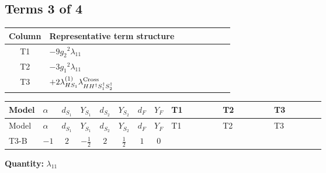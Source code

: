 \documentclass[8pt]{article}
\begin{document}
\begin{landscape}
\subsection*{Terms 3 of 4}
\begin{center}
\begin{tabular}{@{}c >{\raggedright\arraybackslash}p{0.82\linewidth}@{}}
\toprule
Column & Representative term structure \\
\midrule
T1 & \(\displaystyle -9 {g_2}^2 {\lambda_{11}}\) \\
\midrule
T2 & \(\displaystyle -3 {g_1}^2 {\lambda_{11}}\) \\
\midrule
T3 & \(\displaystyle +2 {\lambda_{HS_1}^{(1)}} {\lambda_{H H^\dagger S_1^\dagger S_2^\dagger}^{\rm Cross}}\) \\
\midrule
\bottomrule
\end{tabular}
\end{center}
\smallskip
\tiny
\begin{longtable}{@{}llcccccc >{\raggedright\arraybackslash}p{0.21\linewidth} >{\raggedright\arraybackslash}p{0.21\linewidth} >{\raggedright\arraybackslash}p{0.21\linewidth}@{}}
\toprule
Model & $\alpha$ & $d_{S_1}$ & $Y_{S_1}$ & $d_{S_2}$ & $Y_{S_2}$ & $d_F$ & $Y_F$ & T1 & T2 & T3 \\
\midrule
\endfirsthead
\toprule
Model & $\alpha$ & $d_{S_1}$ & $Y_{S_1}$ & $d_{S_2}$ & $Y_{S_2}$ & $d_F$ & $Y_F$ & T1 & T2 & T3 \\
\midrule
\endhead
T3-B & $-1$ & $2$ & $-\frac{1}{2}$ & $2$ & $\frac{1}{2}$ & $1$ & $0$ & \scriptsize\adjustbox{max width=\linewidth}{$\begin{gathered} -9 {g_2}^2 {\lambda_{11}}\end{gathered}$} & \scriptsize\adjustbox{max width=\linewidth}{$\begin{gathered} -3 {g_1}^2 {\lambda_{11}}\end{gathered}$} & \scriptsize\adjustbox{max width=\linewidth}{$\begin{gathered} +2 {\lambda_{HS_1}^{(1)}} {\lambda_{H H^\dagger S_1^\dagger S_2^\dagger}^{\rm Cross}}\end{gathered}$} \\
\midrule
\bottomrule
\end{longtable}
\clearpage
\noindent\textbf{Quantity: }$\lambda_{11}$\par\smallskip

\end{landscape}
\end{document}
